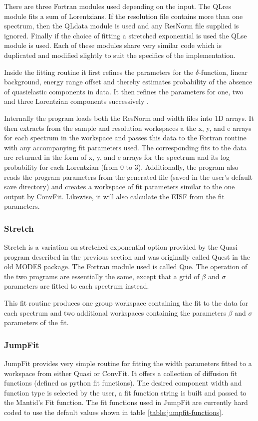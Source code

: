 \documentclass[paper=a4, fontsize=11pt]{scrartcl}	%
\numberwithin{equation}{section}															%
\numberwithin{figure}{section}																%
\numberwithin{table}{section}																%
\begin{document}
There are three Fortran modules used depending on the input. The QLres module fits a sum of Lorentzians. If the resolution file contains more than one spectrum, then the QLdata module is used and any ResNorm file supplied is ignored. Finally if the choice of fitting a stretched exponential is used the QLse module is used. Each of these modules share very similar code which is duplicated and modified slightly to suit the specifics of the implementation.

Inside the fitting routine it first refines the parameters for the $\delta$-function, linear background, energy range offset and thereby estimates probability of the absence of quasielastic components in data. It then refines the parameters for one, two and three Lorentzian components successively \cite{dssivia1992}.

Internally the program loads both the ResNorm and width files into 1D arrays. It then extracts from the sample and resolution workspaces a the x, y, and e arrays for each spectrum in the workspace and passes this data to the Fortran routine with any accompanying fit parameters used. The corresponding fits to the data are returned in the form of x, y, and e arrays for the spectrum and its log probability for each Lorentzian (from 0 to 3). Additionally, the program also reads the program parameters from the generated file (saved in the user's default save directory) and creates a workspace of fit parameters similar to the one output by ConvFit. Likewise, it will also calculate the EISF from the fit parameters.

\subsubsection{Stretch}
\label{subsec:stretch}
Stretch is a variation on stretched exponential option provided by the Quasi program described in the previous section and was originally called Quest in the old MODES package. The Fortran module used is called Que. The operation of the two programs are essentially the same, except that a grid of $\beta$ and $\sigma$ parameters are fitted to each spectrum instead.

This fit routine produces one group workspace containing the fit to the data for each spectrum and two additional workspaces containing the parameters $\beta$ and $\sigma$ parameters of the fit.

\subsubsection{JumpFit}
\label{subsec:jumpfit}
JumpFit provides very simple routine for fitting the width parameters fitted to a workspace from either Quasi or ConvFit. It offers a collection of diffusion fit functions (defined as python fit functions). The desired component width and function type is selected by the user, a fit function string is built and passed to the Mantid's Fit function. The fit functions used in JumpFit are currently hard coded to use the default values shown in table \ref{table:jumpfit-functions}.
\end{document}
